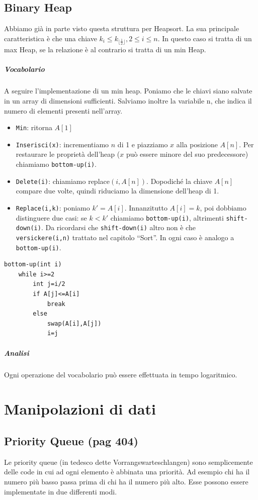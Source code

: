 \documentclass[a4paper]{book}
\newcommand{\inline}[1]{\lstinline!#1!}%
\newcommand{\lstIndent}{4}
\begin{document}
\section{Binary Heap}
Abbiamo già in parte visto questa struttura per Heapsort. La sua principale caratteristica è che una chiave $k_i \leq k_{\lfloor\frac{1}{2} \rfloor}, 2\leq i\leq n$. In questo caso si tratta di un max Heap, se la relazione è al contrario si tratta di un min Heap. 
\paragraph*{Vocabolario}
A seguire l'implementazione di un min heap. Poniamo che le chiavi siano salvate in un array di dimensioni sufficienti. Salviamo inoltre la variabile n, che indica il numero di elementi presenti nell'array.
\begin{itemize}
\item \inline{Min}: ritorna $A[1]$
\item \inline{Inserisci(x)}: incrementiamo $n$ di 1 e piazziamo $x$ alla posizione $A[n]$. Per restaurare le proprietà dell'heap ($x$ può essere minore del suo predecessore) chiamiamo \inline{bottom-up(i)}.
\item \inline{Delete(i)}: chiamiamo replace$(i,A[n])$. Dopodiché la chiave $A[n]$ compare due volte, quindi riduciamo la dimensione dell'heap di 1. 
\item \inline{Replace(i,k)}: poniamo $k'=A[i]$. Innanzitutto $A[i]=k$, poi dobbiamo distinguere due casi: se $k<k'$ chiamiamo \inline{bottom-up(i)}, altrimenti \inline{shift-down(i)}. Da ricordarsi che \inline{shift-down(i)} altro non è che \\\inline{versickere(i,n)} trattato nel capitolo ``Sort''. In ogni caso è analogo a \inline{bottom-up(i)}.
\end{itemize}
\begin{lstlisting}[tabsize=\lstIndent]
bottom-up(int i)
	while i>=2
		int j=i/2
		if A[j]<=A[i]
			break
		else
			swap(A[i],A[j])
			i=j	
\end{lstlisting}
\paragraph*{Analisi}
Ogni operazione del vocabolario può essere effettuata in tempo logaritmico.
\chapter{Manipolazioni di dati}
\section{Priority Queue (pag 404)}
Le priority queue (in tedesco dette Vorrangswarteschlangen) sono semplicemente delle code in cui ad ogni elemento è abbinata una priorità. Ad esempio chi ha il numero più basso passa prima di chi ha il numero più alto. Esse possono essere implementate in due differenti modi.
\end{document}
